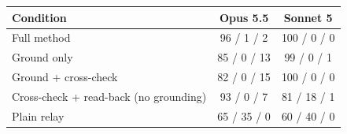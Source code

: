 \begin{tabular}{lcc}
\toprule
Condition & Opus 5.5 & Sonnet 5 \\
\midrule
Full method & 96 / 1 / 2 & 100 / 0 / 0 \\
Ground only & 85 / 0 / 13 & 99 / 0 / 1 \\
Ground + cross-check & 82 / 0 / 15 & 100 / 0 / 0 \\
Cross-check + read-back (no grounding) & 93 / 0 / 7 & 81 / 18 / 1 \\
Plain relay & 65 / 35 / 0 & 60 / 40 / 0 \\
\bottomrule
\end{tabular}
